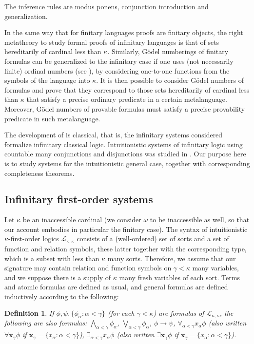 \documentclass[a4paper,11pt]{article}
\theoremstyle{plain}
\theoremstyle{plain}
\newtheorem{defs}[thm]{Definition}
\theoremstyle{remark}
\begin{document}
The inference rules are modus ponens, conjunction introduction and generalization.

In the same way that for finitary languages proofs are finitary objects, the right metatheory to study formal proofs of infinitary languages is that of sets hereditarily of cardinal less than $\kappa$. Similarly, G\"odel numberings of finitary formulas can be generalized to the infinitary case if one uses (not necessarily finite) ordinal numbers (see \cite{karp}), by considering one-to-one functions from the symbols of the language into $\kappa$. It is then possible to consider G\"odel numbers of formulas and prove that they correspond to those sets hereditarily of cardinal less than $\kappa$ that satisfy a precise ordinary predicate in a certain metalanguage. Moreover, G\"odel numbers of provable formulas must satisfy a precise provability predicate in such metalanguage.

The development of \cite{karp} is classical, that is, the infinitary systems considered formalize infinitary classical logic. Intuitionistic systems of infinitary logic using countable many conjunctions and disjunctions was studied in \cite{nadel}. Our purpose here is to study systems for the intuitionistic general case, together with corresponding completeness theorems.


\subsection{Infinitary first-order systems}

Let $\kappa$ be an inaccessible cardinal (we consider $\omega$ to be inaccessible as well, so that our account embodies in particular the finitary case). The syntax of intuitionistic $\kappa$-first-order logics $\mathcal{L}_{\kappa, \kappa}$ consists of a (well-ordered) set of sorts and a set of function and relation symbols, these latter together with the corresponding type, which is a subset with less than $\kappa$ many sorts. Therefore, we assume that our signature may contain relation and function symbols on $\gamma<\kappa$ many variables, and we suppose there is a supply of $\kappa$ many fresh variables of each sort. Terms and atomic formulas are defined as usual, and general formulas are defined inductively according to the following:

\begin{defs} If $\phi, \psi, \{\phi_{\alpha}: \alpha<\gamma\}$ (for each $\gamma<\kappa$) are formulas of $\mathcal{L}_{\kappa, \kappa}$, the following are also formulas: $\bigwedge_{\alpha<\gamma}\phi_{\alpha}$, $\bigvee_{\alpha<\gamma}\phi_{\alpha}$, $\phi \to \psi$, $\forall_{\alpha<\gamma} x_{\alpha} \phi$ (also written $\forall \mathbf{x}_{\gamma} \phi$ if $\mathbf{x}_{\gamma}=\{x_{\alpha}: \alpha<\gamma\}$), $\exists_{\alpha<\gamma} x_{\alpha} \phi$ (also written $\exists \mathbf{x}_{\gamma} \phi$ if $\mathbf{x}_{\gamma}=\{x_{\alpha}: \alpha<\gamma\}$).
\end{defs}
 
\end{document}

